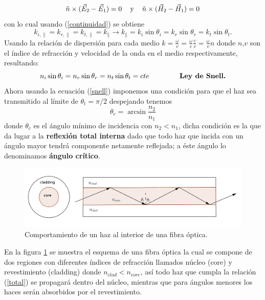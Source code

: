 \begin{equation}\label{continuidad}
    \hat{n} \times (\Vec{E}_2 - \Vec{E}_1) = 0 \hspace{3mm}\text{ y }\hspace{3mm}\hat{n} \times (\Vec{H}_2 - \Vec{H}_1) = 0
\end{equation}
con lo cual usando (\ref{continuidad}) se obtiene
\begin{equation}\label{continuidad2}
    k_{i,\parallel} = k_{r,\parallel} = k_{t,\parallel} = k_{\parallel} \xrightarrow{} k_{\parallel}=k_i \sin{\theta_i}=k_r \sin{\theta_r}=k_t \sin{\theta_t}.
\end{equation}
Usando la relación de dispersión para cada medio $k=\frac{\omega}{v}=\frac{\omega}{c}\frac{c}{v}=\frac{\omega}{v}n$ donde $n$,$v$ son el índice de refracción y velocidad de la onda en el medio respectivamente, resultando:
\begin{equation}\label{snell}
    n_i\sin{\theta_i}=n_r\sin{\theta_r}=n_t\sin{\theta_t}=cte \hspace{15mm}\text{\textbf{Ley de Snell.}}
\end{equation}
Ahora usando la ecuación (\ref{snell}) imponemos una condición para que el haz sea transmitido al límite de $\theta_t=\pi/2$ despejando tenemos
\begin{equation}\label{total}
    \theta_c = \arcsin{\frac{n_2}{n_1}}
\end{equation}
donde $\theta_c$ es el ángulo mínimo de incidencia con $n_2<n_1$, dicha condición es la que da lugar a la \textbf{reflexión total interna} dado que todo haz que incida con un ángulo mayor tendrá componente netamente reflejada; a éste ángulo lo denominamos \textbf{ángulo crítico}.

\begin{figure}[H]
\centering
\includegraphics[width=0.76\linewidth]{Kap1/fibra.png}
\caption{Comportamiento de un haz al interior de una fibra óptica.} 
\label{fibra}
\end{figure}
En la figura \ref{fibra} se muestra el esquema de una fibra óptica la cual se compone de dos regiones con diferentes índices de refracción llamados núcleo (core) y revestimiento (cladding) donde $n_{clad}<n_{core}$, así todo haz que cumpla la relación (\ref{total}) se propagará dentro del núcleo, mientras que para ángulos menores los haces serán absorbidos por el revestimiento.


